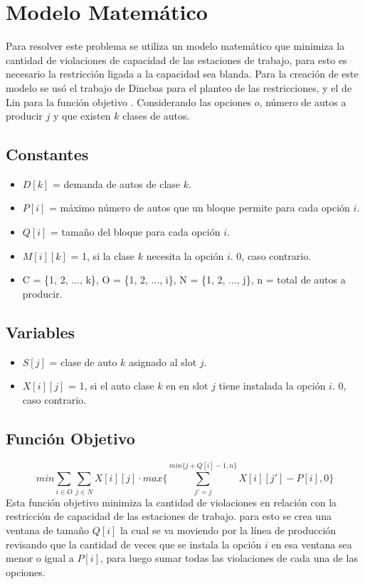 \documentclass[letter, 10pt]{article}
\begin{document}
\section{Modelo Matem\'atico}
Para resolver este problema se utiliza un modelo matem\'atico que minimiza la cantidad de violaciones de capacidad de las estaciones de trabajo, para esto es necesario la restricci\'on ligada a la capacidad sea blanda. Para la creaci\'on de este modelo se us\'o el trabajo de Dincbas \cite{Dincbas} para el planteo de las restricciones, y el de Lin para la funci\'on objetivo \cite{Lin}. Considerando las opciones $o$, n\'umero de autos a producir $j$ y que existen $k$ clases de autos.
\subsection{Constantes}
\begin{itemize}
    \item $D[k]$ = demanda de autos de clase $k$.
    \item $P[i]$ = m\'aximo n\'umero de autos que un bloque permite para cada opci\'on $i$.
    \item $Q[i]$ = tama\~{n}o del bloque para cada opci\'on $i$.
    \item $M[i][k]$ = 1, si la clase $k$ necesita la opci\'on $i$. 0, caso contrario.
    \item C = \{1, 2, ..., k\}, O = \{1, 2, ..., i\}, N = \{1, 2, ..., j\}, n = total de autos a producir.
\end{itemize}

\subsection{Variables}
\begin{itemize}

    \item $S[j]$ = clase de auto $k$ asignado al slot $j$.
    \item $X[i][j]$ = 1, si el auto clase $k$ en en slot $j$ tiene instalada la opci\'on $i$. 0, caso contrario.
\end{itemize}

\subsection{Funci\'on Objetivo}

\begin{equation}
    min\sum_{i \in O}^{}\sum_{j \in N}^{} X[i][j] \cdot max\{\sum_{j'=j}^{min\{j+Q[i]-1,n\}} X[i][j'] - P[i], 0\}
\end{equation}
Esta funci\'on objetivo minimiza la cantidad de violaciones en relaci\'on con la restricci\'on de capacidad de las estaciones de trabajo. para esto se crea una ventana de tama\~{n}o $Q[i]$ la cual se va moviendo por la l\'inea de producci\'on revisando que la cantidad de veces que se instala la opci\'on $i$ en esa ventana sea menor o igual a $P[i]$, para luego sumar todas las violaciones de cada una de las opciones. 
\end{document}
